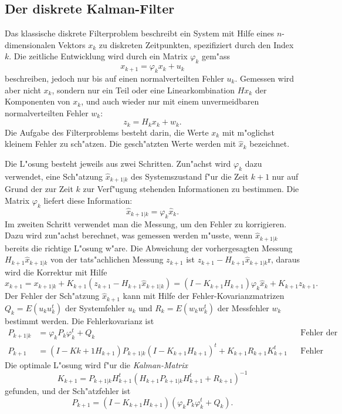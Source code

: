 \subsection{Der diskrete Kalman-Filter\label{skript:diskreter-kalman-filter}}
Das klassische diskrete Filterproblem beschreibt ein System mit Hilfe
eines $n$-dimensionalen Vektors $x_k$ zu diskreten Zeitpunkten, spezifiziert
durch den Index $k$.
Die zeitliche Entwicklung wird durch ein Matrix $\varphi_k$
gem"ass
\begin{equation}
x_{k+1} = \varphi_k x_k + u_k
\label{stochastisch:diskrete-entwicklungs-gleichung}
\end{equation}
beschreiben, jedoch nur bis auf einen normalverteilten Fehler $u_k$.
Gemessen wird aber nicht $x_k$, sondern nur ein Teil oder eine
Linearkombination $Hx_k$ der Komponenten von $x_k$, und auch wieder
nur mit einem unvermeidbaren normalverteilten Fehler $w_k$:
\[
z_k=H_kx_k + w_k.
\]
Die Aufgabe des Filterproblems besteht darin, die Werte $x_k$ mit m"oglichst
kleinem Fehler zu sch"atzen.
Die gesch"atzten Werte werden mit $\hat x_k$ bezeichnet.

Die L"osung besteht jeweils aus zwei Schritten. 
Zun"achst wird $\varphi_k$ dazu verwendet, eine Sch"atzung $\hat x_{k+1|k}$
des Systemszustand f"ur die Zeit $k+1$ nur auf Grund der zur Zeit
$k$ zur Verf"ugung stehenden Informationen zu bestimmen.
Die Matrix $\varphi_k$ liefert diese Information:
\[
\hat x_{k+1|k} = \varphi_k \hat x_k.
\]
Im zweiten Schritt verwendet man die Messung, um den Fehler zu korrigieren.
Dazu wird zun"achst berechnet, was gemessen werden m"usste, wenn
$\hat x_{k+1|k}$ bereits die richtige L"osung w"are.
Die Abweichung der vorhergesagten Messung $H_{k+1}\hat x_{k+1|k}$
von der tats"achlichen Messung $z_{k+1}$ ist
$z_{k+1}-H_{k+1}\hat x_{k+1|k}$r, daraus wird die Korrektur mit Hilfe
\[
\hat x_{k+1}
=
x_{k+1|k} + K_{k+1}(z_{k+1} - H_{k+1} \hat x_{k+1|k})
=
(I-K_{k+1}H_{k+1}) \varphi_{k}\hat x_k + K_{k+1}z_{k+1}.
\]
Der Fehler der Sch"atzung $\hat x_{k+1}$ kann mit Hilfe der
Fehler-Kovarianzmatrizen $Q_k=E(u_ku^t_k)$ der Systemfehler $u_k$
und $R_k=E(w_kw_k^t)$ der Messfehler $w_k$ bestimmt werden.
Die Fehlerkovarianz ist
\begin{align*}
P_{k+1|k}
&=
\varphi_k P_k \varphi_k^t + Q_k
&
&\text{Fehler der Vorhersage}
\\
P_{k+1}
&=
(I-K{k+1}H_{k+1})P_{k+1|k}(I-K_{k+1}H_{k+1})^t + K_{k+1}R_{k+1}K_{k+1}^t
&
&\text{Fehler nach Korrektur}
\end{align*}
Die optimale L"osung wird f"ur die {\em Kalman-Matrix}
\[
K_{k+1}
=
P_{k+1|k}H_{k+1}^t(H_{k+1}P_{k+1|k}H_{k+1}^t + R_{k+1})^{-1}
\]
gefunden, und der Sch"atzfehler ist
\[
P_{k+1}=(I-K_{k+1}H_{k+1})(\varphi_{k}P_k\varphi_k^t+Q_k).
\]

